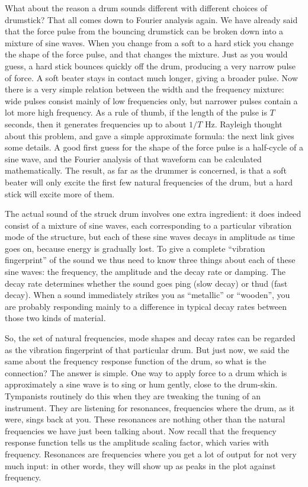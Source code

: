   What about the reason a drum sounds different with different choices of 
  drumstick? That all comes down to Fourier analysis again. We have already 
  said that the force pulse from the bouncing drumstick can be broken down into 
  a mixture of sine waves. When you change from a soft to a hard stick you 
  change the shape of the force pulse, and that changes the mixture. Just as 
  you would guess, a hard stick bounces quickly off the drum, producing a very 
  narrow pulse of force. A soft beater stays in contact much longer, giving a 
  broader pulse. Now there is a very simple relation between the width and the 
  frequency mixture: wide pulses consist mainly of low frequencies only, but 
  narrower pulses contain a lot more high frequency. As a rule of thumb, if the 
  length of the pulse is $T$ seconds, then it generates frequencies up to about 
  $1/T$ Hz. Rayleigh thought about this problem, and gave a simple approximate 
  formula: the next link gives some details. A good first guess for the shape 
  of the force pulse is a half-cycle of a sine wave, and the Fourier analysis 
  of that waveform can be calculated mathematically. The result, as far as the 
  drummer is concerned, is that a soft beater will only excite the first few 
  natural frequencies of the drum, but a hard stick will excite more of them. 

  The actual sound of the struck drum involves one extra ingredient: it does 
  indeed consist of a mixture of sine waves, each corresponding to a particular 
  vibration mode of the structure, but each of these sine waves decays in 
  amplitude as time goes on, because energy is gradually lost. To give a 
  complete ``vibration fingerprint'' of the sound we thus need to know three 
  things about each of these sine waves: the frequency, the amplitude and the 
  decay rate or damping. The decay rate determines whether the sound goes ping 
  (slow decay) or thud (fast decay). When a sound immediately strikes you as 
  ``metallic'' or ``wooden'', you are probably responding mainly to a 
  difference in typical decay rates between those two kinds of material. 

  So, the set of natural frequencies, mode shapes and decay rates can be 
  regarded as the vibration fingerprint of that particular drum. But just now, 
  we said the same about the frequency response function of the drum, so what 
  is the connection? The answer is simple. One way to apply force to a drum 
  which is approximately a sine wave is to sing or hum gently, close to the 
  drum-skin. Tympanists routinely do this when they are tweaking the tuning of 
  an instrument. They are listening for resonances, frequencies where the drum, 
  as it were, sings back at you. These resonances are nothing other than the 
  natural frequencies we have just been talking about. Now recall that the 
  frequency response function tells us the amplitude scaling factor, which 
  varies with frequency. Resonances are frequencies where you get a lot of 
  output for not very much input: in other words, they will show up as peaks in 
  the plot against frequency. 

